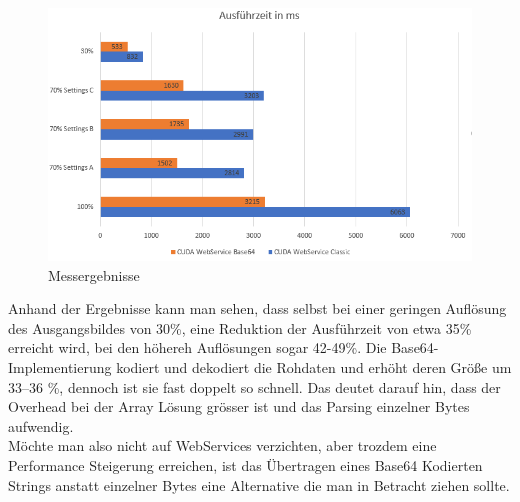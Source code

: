 \begin{figure}[ht] 
\centering 
\includegraphics[scale=0.8]{Vergleich}  
\caption{Messergebnisse} 
\end{figure}

Anhand der Ergebnisse kann man sehen, dass selbst bei einer geringen Aufl\"osung des Ausgangsbildes von 30\%, 
eine Reduktion der Ausf\"uhrzeit von etwa 35\% erreicht wird, bei den h\"ohereh Aufl\"osungen sogar 42-49\%{}.
Die Base64-Implementierung kodiert und dekodiert die Rohdaten und erh\"oht deren Gr\"o\ss{}e um 33–36 \%,
dennoch ist sie fast doppelt so schnell. Das deutet darauf hin, dass der Overhead bei der Array L\"osung gr\"osser ist 
und das Parsing einzelner Bytes aufwendig.\\
M\"ochte man also nicht auf WebServices verzichten, aber trozdem eine Performance Steigerung erreichen, 
ist das \"Ubertragen eines Base64 Kodierten Strings anstatt einzelner Bytes eine Alternative die man in Betracht ziehen sollte. 